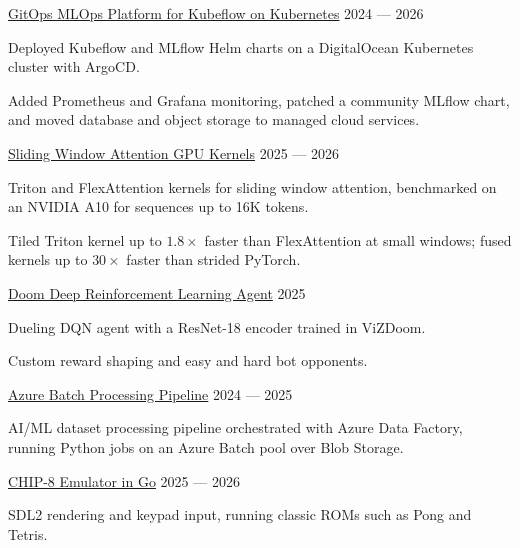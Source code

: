 \documentclass[letterpaper]{resume_config}
\begin{document}
\ProjectEntry
    {\href{https://github.com/mahdikhashan/jku-kv-cloud-computing}{GitOps MLOps Platform for Kubeflow on Kubernetes}}
    {2024 --- 2026}
    {
        \item Deployed Kubeflow and MLflow Helm charts on a DigitalOcean Kubernetes cluster with ArgoCD.
        \item Added Prometheus and Grafana monitoring, patched a community MLflow chart, and moved database and object storage to managed cloud services.
    }

\ProjectEntry
    {\href{https://github.com/mahdikhashan/jku-ai-practical-project}{Sliding Window Attention GPU Kernels}}
    {2025 --- 2026}
    {
        \item Triton and FlexAttention kernels for sliding window attention, benchmarked on an NVIDIA A10 for sequences up to 16K tokens.
        \item Tiled Triton kernel up to $1.8\times$ faster than FlexAttention at small windows; fused kernels up to $30\times$ faster than strided PyTorch.
    }

\ProjectEntry
    {\href{https://github.com/mahdikhashan/jku-deep-reinforcement-learning-doom-env}{Doom Deep Reinforcement Learning Agent}}
    {2025}
    {
        \item Dueling DQN agent with a ResNet-18 encoder trained in ViZDoom.
        \item Custom reward shaping and easy and hard bot opponents.
    }

\ProjectEntry
    {\href{https://github.com/mahdikhashan/azure-batch-processing-pipeline}{Azure Batch Processing Pipeline}}
    {2024 --- 2025}
    {
        \item AI/ML dataset processing pipeline orchestrated with Azure Data Factory, running Python jobs on an Azure Batch pool over Blob Storage.
    }

\ProjectEntry
    {\href{https://github.com/mahdikhashan/chip-8-go}{CHIP-8 Emulator in Go}}
    {2025 --- 2026}
    {
        \item SDL2 rendering and keypad input, running classic ROMs such as Pong and Tetris.
    }

\vspace{-6pt}

\end{document}
